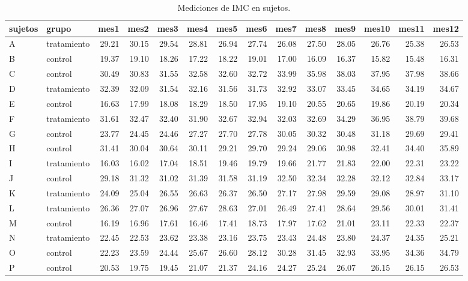 \documentclass[]{article}
\begin{document}
\begin{table}[H]
\centering
\begingroup\tiny
\begin{tabular}{llrrrrrrrrrrrr}
  \hline
sujetos & grupo & mes1 & mes2 & mes3 & mes4 & mes5 & mes6 & mes7 & mes8 & mes9 & mes10 & mes11 & mes12 \\ 
  \hline
A & tratamiento & 29.21 & 30.15 & 29.54 & 28.81 & 26.94 & 27.74 & 26.08 & 27.50 & 28.05 & 26.76 & 25.38 & 26.53 \\ 
  B & control & 19.37 & 19.10 & 18.26 & 17.22 & 18.22 & 19.01 & 17.00 & 16.09 & 16.37 & 15.82 & 15.48 & 16.31 \\ 
  C & control & 30.49 & 30.83 & 31.55 & 32.58 & 32.60 & 32.72 & 33.99 & 35.98 & 38.03 & 37.95 & 37.98 & 38.66 \\ 
  D & tratamiento & 32.39 & 32.09 & 31.54 & 32.16 & 31.56 & 31.73 & 32.92 & 33.07 & 33.45 & 34.65 & 34.19 & 34.67 \\ 
  E & control & 16.63 & 17.99 & 18.08 & 18.29 & 18.50 & 17.95 & 19.10 & 20.55 & 20.65 & 19.86 & 20.19 & 20.34 \\ 
  F & tratamiento & 31.61 & 32.47 & 32.40 & 31.90 & 32.67 & 32.94 & 32.03 & 32.69 & 34.29 & 36.95 & 38.79 & 39.68 \\ 
  G & control & 23.77 & 24.45 & 24.46 & 27.27 & 27.70 & 27.78 & 30.05 & 30.32 & 30.48 & 31.18 & 29.69 & 29.41 \\ 
  H & control & 31.41 & 30.04 & 30.64 & 30.11 & 29.21 & 29.70 & 29.24 & 29.06 & 30.98 & 32.41 & 34.40 & 35.89 \\ 
  I & tratamiento & 16.03 & 16.02 & 17.04 & 18.51 & 19.46 & 19.79 & 19.66 & 21.77 & 21.83 & 22.00 & 22.31 & 23.22 \\ 
  J & control & 29.18 & 31.32 & 31.02 & 31.39 & 31.58 & 31.19 & 32.50 & 32.34 & 32.28 & 32.12 & 32.84 & 33.17 \\ 
  K & tratamiento & 24.09 & 25.04 & 26.55 & 26.63 & 26.37 & 26.50 & 27.17 & 27.98 & 29.59 & 29.08 & 28.97 & 31.10 \\ 
  L & tratamiento & 26.36 & 27.07 & 26.96 & 27.67 & 28.63 & 27.01 & 26.49 & 27.41 & 28.64 & 29.56 & 30.01 & 31.41 \\ 
  M & control & 16.19 & 16.96 & 17.61 & 16.46 & 17.41 & 18.73 & 17.97 & 17.62 & 21.01 & 23.11 & 22.33 & 22.37 \\ 
  N & tratamiento & 22.45 & 22.53 & 23.62 & 23.38 & 23.16 & 23.75 & 23.43 & 24.48 & 23.80 & 24.37 & 24.35 & 25.21 \\ 
  O & control & 22.23 & 23.59 & 24.44 & 25.67 & 26.60 & 28.12 & 30.28 & 31.45 & 32.93 & 33.95 & 34.36 & 34.79 \\ 
  P & control & 20.53 & 19.75 & 19.45 & 21.07 & 21.37 & 24.16 & 24.27 & 25.24 & 26.07 & 26.15 & 26.15 & 26.53 \\ 
   \hline
\end{tabular}
\endgroup
\caption{Mediciones de IMC en sujetos.} 
\label{tab:sujetos}
\end{table}
\end{document}
